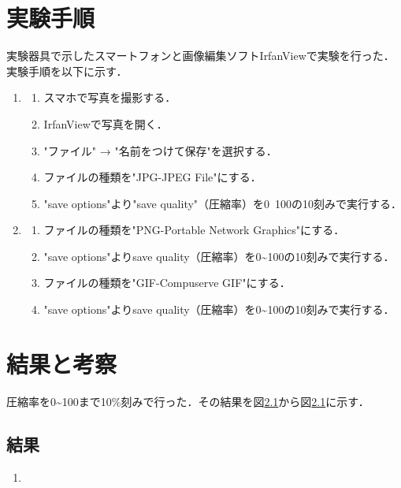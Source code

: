 \documentclass[a4paper,11pt]{bxjsarticle}
\begin{document}
\section{実験手順}
実験器具で示したスマートフォンと画像編集ソフトIrfanViewで実験を行った．
実験手順を以下に示す．\\

\begin{enumerate}
  \item \begin{enumerate}
          \item スマホで写真を撮影する．
          \item IrfanViewで写真を開く．
          \item "ファイル" → "名前をつけて保存"を選択する．
          \item ファイルの種類を"JPG-JPEG File"にする．
          \item "save options"より"save quality"（圧縮率）を0~100の10刻みで実行する．
        \end{enumerate}
  \item \begin{enumerate}
          \item ファイルの種類を"PNG-Portable Network Graphics"にする．
          \item "save options"よりsave quality（圧縮率）を0\textasciitilde100の10刻みで実行する．
          \item ファイルの種類を"GIF-Compuserve GIF"にする．
          \item "save options"よりsave quality（圧縮率）を0\textasciitilde100の10刻みで実行する．
        \end{enumerate}
\end{enumerate}



\section{結果と考察}
圧縮率を0\textasciitilde100まで10\%刻みで行った．その結果を図\ref{}から図\ref{}に示す．
  \subsection{結果}
  \begin{enumerate}
    \item 
  \end{enumerate}

  　
\end{document}

